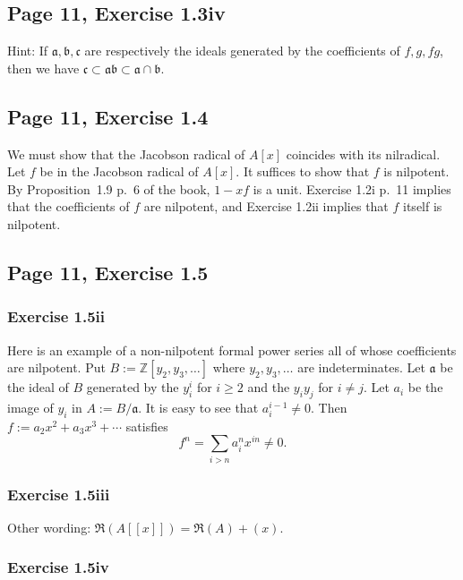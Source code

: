 \documentclass[parskip=half,fontsize=12pt]{scrartcl}%
\newcommand{\mf}{\mathfrak}
\newcommand{\aaa}{\mf a}
\newcommand{\bbb}{\mf b}
\newcommand{\ccc}{\mf c}
\begin{document}
\subsection{Page 11, Exercise 1.3iv}%

Hint: If $\aaa,\bbb,\ccc$ are respectively the ideals generated by the coefficients of $f,g,fg$, then we have $\ccc\subset\aaa\bbb\subset\aaa\cap\bbb$.  

\subsection{Page 11, Exercise 1.4}%

We must show that the Jacobson radical of $A[x]$ coincides with its nilradical. Let $f$ be in the Jacobson radical of $A[x]$. It suffices to show that $f$ is nilpotent. By Proposition~1.9 p.~6 of the book, $1-xf$ is a unit. Exercise 1.2i p.~11 implies that the coefficients of $f$ are nilpotent, and Exercise 1.2ii implies that $f$ itself is nilpotent.

\subsection{Page 11, Exercise 1.5}%

\subsubsection{Exercise 1.5ii}

Here is an example of a non-nilpotent formal power series all of whose coefficients are nilpotent. Put $B:=\mathbb Z[y_2,y_3,\dots]$ where $y_2,y_3,\dots$ are indeterminates. Let $\aaa$ be the ideal of $B$ generated by the $y_i^i$ for $i\ge2$ and the $y_iy_j$ for $i\neq j$. Let $a_i$ be the image of $y_i$ in $A:=B/\aaa$. It is easy to see that $a_i^{i-1}\neq0$. Then $f:=a_2x^2+a_3x^3+\cdots$ satisfies 
$$
f^n=\sum_{i>n}a_i^nx^{in}\neq0.
$$

\subsubsection{Exercise 1.5iii}%

Other wording: $\mf R(A[[x]])=\mf R(A)+(x)$.

\subsubsection{Exercise 1.5iv}%
\end{document}
